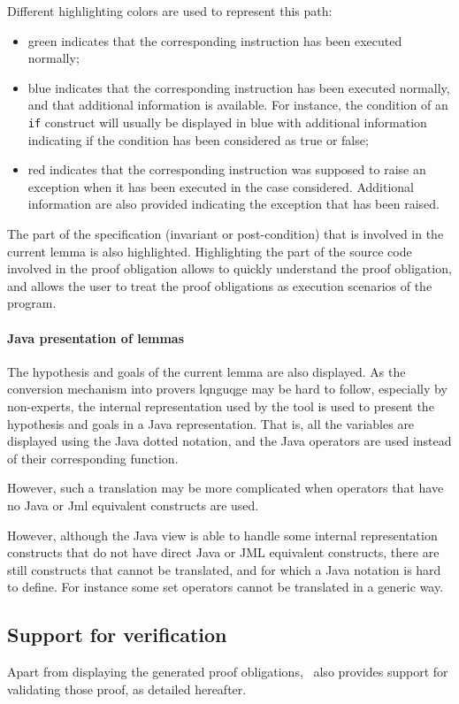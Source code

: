 Different highlighting colors are used to represent this path:
\begin{itemize}
\item green indicates that the corresponding instruction has been
   executed normally;
\item blue indicates that the corresponding instruction has been
   executed normally, and that additional information is
   available. For instance, the condition of an \texttt{if} construct will
   usually be displayed in blue with additional information indicating
   if the condition has been considered as true or false;
\item red indicates that the corresponding instruction was supposed to
   raise an exception when it has been executed in the case
   considered.  Additional information are also provided indicating
   the exception that has been raised.
\end{itemize}
The part of the specification (invariant or post-condition) that is
involved in the current lemma is also highlighted.  Highlighting the
part of the source code involved in the proof obligation allows to
quickly understand the proof obligation, and allows the user to treat
the proof obligations as execution scenarios of the program.
\paragraph{Java presentation of lemmas}
The hypothesis and goals of the current lemma are also displayed. As
the conversion mechanism into provers lqnguqge may be hard to follow, especially by
non-experts, the internal representation used by the tool is used to
present the hypothesis and goals in a Java representation. That is,
all the variables are displayed using the Java dotted notation, and
the Java operators are used instead of their corresponding function.

However, such a translation may be more complicated when operators that
have no Java or Jml equivalent constructs are used.  


 However, although the Java view is able to handle some internal
 representation constructs that do not have direct Java or JML
 equivalent constructs, there are still constructs that cannot be
 translated, and for which a Java notation is hard to define. For
 instance some set operators cannot be translated in a generic way.

\subsection{Support for verification}
Apart from displaying the generated proof obligations, \JACK\ also
provides support for validating those proof, as detailed hereafter.

